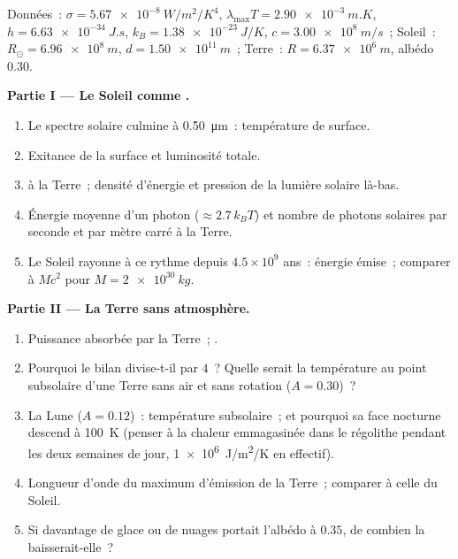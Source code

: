 \begin{problem}\label{pb:b2:thermal-radiation:1}
Données~: $\sigma = \qty{5.67e-8}{W/m^2/K^4}$, $\lambda_{\max}T = \qty{2.90e-3}{m.K}$,
$h = \qty{6.63e-34}{J.s}$, $k_B = \qty{1.38e-23}{J/K}$, $c = \qty{3.00e8}{m/s}$~;
Soleil~: $R_\odot = \qty{6.96e8}{m}$, $d = \qty{1.50e11}{m}$~; Terre~: $R =
\qty{6.37e6}{m}$, albédo $0.30$.

\textbf{Partie I --- Le Soleil comme .}
\begin{enumerate}
  \item Le spectre solaire culmine à \qty{0.50}{\micro m}~: température
        de surface.
  \item Exitance de la surface et luminosité totale.
  \item {} à la Terre~; densité d'énergie et pression de
        la lumière solaire là-bas.
  \item Énergie moyenne d'un photon ($\approx 2.7\,k_BT$) et nombre de photons
        solaires par seconde et par mètre carré à la Terre.
  \item Le Soleil rayonne à ce rythme depuis $4.5 \times 10^9$ ans~:
        énergie émise~; comparer à $Mc^2$ pour $M = \qty{2e30}{kg}$.
\end{enumerate}

\textbf{Partie II --- La Terre sans atmosphère.}
\begin{enumerate}[resume]
  \item Puissance absorbée par la Terre~; .
  \item Pourquoi le bilan divise-t-il par $4$~? Quelle serait la
        température au point subsolaire d'une Terre sans air et sans
        rotation ($A = 0.30$)~?
  \item La Lune ($A = 0.12$)~: température subsolaire~; et pourquoi sa face
        nocturne descend à \qty{100}{K} (penser à la chaleur emmagasinée dans le
        régolithe pendant les deux semaines de jour, \qty{1e6}{J/m^2/K} en effectif).
  \item Longueur d'onde du maximum d'émission de la Terre~; comparer à celle
        du Soleil.
  \item Si davantage de glace ou de nuages portait l'albédo à $0.35$, de combien
        la  baisserait-elle~?
\end{enumerate}


\end{problem}
